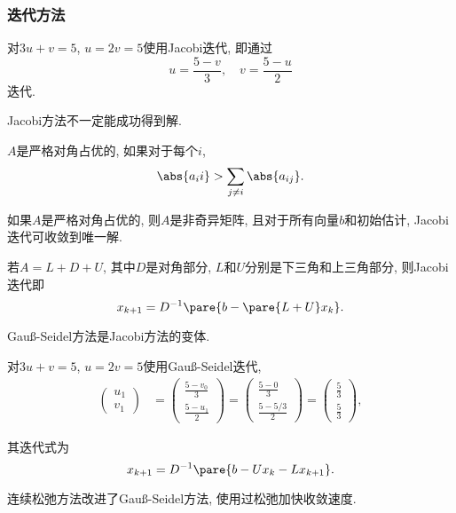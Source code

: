 \documentclass[20pt]{extarticle}
\begin{document}

\subsubsection{迭代方法} %
\label{ssub:迭代方法}

\begin{ex}
    对$3u+v=5$, $u=2v=5$使用Jacobi迭代, 即通过
    \[ u = \frac{5-v}{3},\quad v = \frac{5-u}{2} \]
    迭代.
\end{ex}
Jacobi方法不一定能成功得到解.
\begin{definition}
    $A$是严格对角占优的, 如果对于每个$i$,
    \[ \abs{a_ii} > \sum_{j\neq i} \abs{a_{ij}}. \]
\end{definition}
\begin{theorem}
    如果$A$是严格对角占优的, 则$A$是非奇异矩阵, 且对于所有向量$b$和初始估计, Jacobi迭代可收敛到唯一解.
\end{theorem}
若$A=L+D+U$, 其中$D$是对角部分, $L$和$U$分别是下三角和上三角部分, 则Jacobi迭代即
\[ x_{k+1} = D^{-1} \pare{b-\pare{L+U}x_k}. \]
\par
Gau\ss-Seidel方法是Jacobi方法的变体.
\begin{ex}
    对$3u+v=5$, $u=2v=5$使用Gau\ss-Seidel迭代,
    \begin{align*}
        \begin{pmatrix}
            u_1 \\ v_1
        \end{pmatrix} &= \begin{pmatrix}
            \displaystyle \frac{5-v_0}{3} \\[1em] \displaystyle \frac{5-u_1}{2}
        \end{pmatrix} = \begin{pmatrix}
            \displaystyle \frac{5-0}{3} \\[1em] \displaystyle \frac{5-5/3}{2}
        \end{pmatrix} = \begin{pmatrix}
            \displaystyle \frac{5}{3} \\[1em] \displaystyle \frac{5}{3}
        \end{pmatrix},
    \end{align*}
\end{ex}
其迭代式为
\[ x_{k+1} = D^{-1}\pare{b-Ux_k - Lx_{k+1}}. \]
\par
连续松弛方法改进了Gau\ss-Seidel方法, 使用过松弛加快收敛速度.
\end{document}
